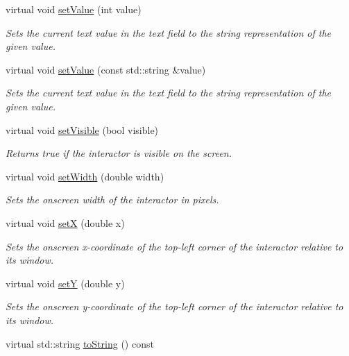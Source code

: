 \begin{DoxyCompactItemize}
virtual void \mbox{\hyperlink{classGTextField_a23d79e21b8ed72e19278ca31d47b8c87}{set\+Value}} (int value)
\begin{DoxyCompactList}\small\item\em Sets the current text value in the text field to the string representation of the given value. \end{DoxyCompactList}\item 
virtual void \mbox{\hyperlink{classGTextField_ab18c7a418be64c4f909beebc277a1321}{set\+Value}} (const std\+::string \&value)
\begin{DoxyCompactList}\small\item\em Sets the current text value in the text field to the string representation of the given value. \end{DoxyCompactList}\item 
virtual void \mbox{\hyperlink{classGInteractor_a18e44e30b31525a243960ca3928125aa}{set\+Visible}} (bool visible)
\begin{DoxyCompactList}\small\item\em Returns true if the interactor is visible on the screen. \end{DoxyCompactList}\item 
virtual void \mbox{\hyperlink{classGInteractor_aa3f3fba4cb131baa8696ba01e3bceca1}{set\+Width}} (double width)
\begin{DoxyCompactList}\small\item\em Sets the onscreen width of the interactor in pixels. \end{DoxyCompactList}\item 
virtual void \mbox{\hyperlink{classGInteractor_a9c18fcc579333bf9653d13ad2b372e39}{setX}} (double x)
\begin{DoxyCompactList}\small\item\em Sets the onscreen x-\/coordinate of the top-\/left corner of the interactor relative to its window. \end{DoxyCompactList}\item 
virtual void \mbox{\hyperlink{classGInteractor_a7d57e2a5c35d27feb58fd498a3cf82b9}{setY}} (double y)
\begin{DoxyCompactList}\small\item\em Sets the onscreen y-\/coordinate of the top-\/left corner of the interactor relative to its window. \end{DoxyCompactList}\item 
virtual std\+::string \mbox{\hyperlink{classGObservable_a1fe5121d6528fdea3f243321b3fa3a49}{to\+String}} () const

\end{DoxyCompactItemize}

